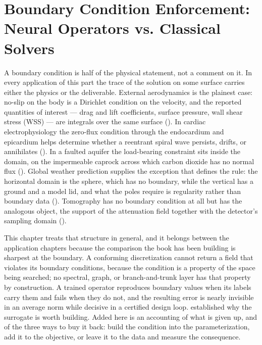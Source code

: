 
\chapter{Boundary Condition Enforcement: Neural Operators vs. Classical Solvers}
\label{ch:part3-boundary-condition-enforcement-neural-oper}
\label{sec:boundary_conditions}

A boundary condition is half of the physical statement, not a comment on it. In every application
of this part the trace of the solution on some surface carries either the physics or the
deliverable.
External aerodynamics is the plainest case: no-slip
on the body is a Dirichlet condition on the velocity, and the reported quantities of
interest --- drag and lift coefficients, surface pressure, wall shear stress (WSS) --- are integrals
over the same surface (). In cardiac
electrophysiology the zero-flux condition through the endocardium and epicardium helps determine
whether a reentrant spiral wave persists, drifts, or annihilates
(). In a faulted aquifer the
load-bearing constraint sits inside the domain, on the impermeable caprock across which carbon
dioxide has no normal flux ().
Global weather prediction supplies the exception that defines the rule: the horizontal domain is
the sphere, which has no boundary, while the vertical has a ground and a model lid, and what the
poles require is regularity rather than boundary data
(). Tomography has no boundary
condition at all but has the analogous object, the support of the attenuation field together with
the detector's sampling domain ().

This chapter treats that structure in general, and it belongs between the application chapters
because the comparison the book has been building is sharpest at the boundary. A conforming
discretization cannot return a field that violates its boundary conditions, because the condition
is a property of the space being searched; no spectral, graph, or branch-and-trunk layer has that
property by construction. A trained operator reproduces boundary values when its labels carry them
and fails when they do not, and the resulting error is nearly invisible in an average norm while
decisive in a certified design loop. 
established why the surrogate is worth building. Added here is an accounting of what is given up,
and of the three ways to buy it back: build the condition into the parameterization, add it to the
objective, or leave it to the data and measure the consequence.

